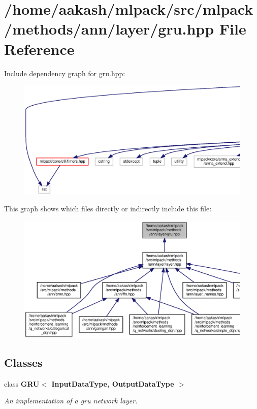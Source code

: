 \section{/home/aakash/mlpack/src/mlpack/methods/ann/layer/gru.hpp File Reference}
\label{gru_8hpp}
Include dependency graph for gru.\+hpp\+:
\nopagebreak
\begin{figure}[H]
\begin{center}
\leavevmode
\includegraphics[width=350pt]{gru_8hpp__incl}
\end{center}
\end{figure}
This graph shows which files directly or indirectly include this file\+:
\nopagebreak
\begin{figure}[H]
\begin{center}
\leavevmode
\includegraphics[width=350pt]{gru_8hpp__dep__incl}
\end{center}
\end{figure}
\subsection*{Classes}
\begin{DoxyCompactItemize}
\item 
class \textbf{ G\+R\+U$<$ Input\+Data\+Type, Output\+Data\+Type $>$}
\begin{DoxyCompactList}\small\item\em An implementation of a gru network layer. \end{DoxyCompactList}\end{DoxyCompactItemize}

